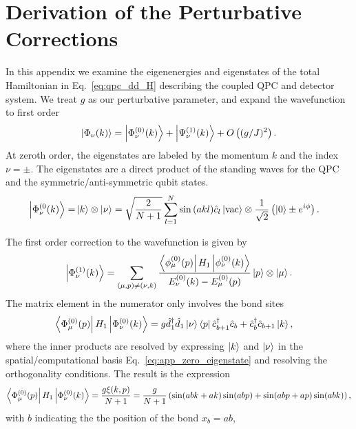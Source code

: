 \documentclass[10pt,
 amsmath,amssymb,
 aps,prb, twocolumn
]{revtex4-2}
\begin{document}
\section{Derivation of the Perturbative Corrections}\label{app:derivation_perturbative}
In this appendix we examine the eigenenergies and eigenstates of the total Hamiltonian in Eq.~\eqref{eq:qpc_dd_H} describing the coupled QPC and detector system. We treat \mbox{$g$} as our perturbative parameter, and expand the wavefunction to first order
\begin{equation}
    \ket{\Phi_{\nu} (k)} = \ket{\Phi^{(0)}_\nu (k)} + \ket{\Psi^{(1)}_\nu (k)} +O\left((g/J)^2\right).
\end{equation}
At zeroth order, the eigenstates are labeled by the momentum \mbox{$k$} and the index \mbox{$\nu = \pm$}. The eigenstates are a direct product of the standing waves for the QPC and the symmetric/anti-symmetric qubit states.
\begin{align}\label{eq:app_zero_eigenstate}
    \ket{\Phi^{(0}_\nu(k)} = & \ket{k}\otimes\ket{\nu} =  \sqrt{\frac{2}{N+1}} \sum_{l=1}^{N} \sin{(a kl)} \hat{c}_l\ket{\text{vac}}\otimes \frac{1}{\sqrt{2}}\left(\ket{0} \pm e^{i\phi}\right).
\end{align}

The first order correction to the wavefunction is given by
\begin{align}\label{eq:app_first_order1}
     \ket{\Phi_\nu^{(1)} (k)} = \sum_{(\mu,p)\neq(\nu,k)} \frac{\bra{\phi^{(0)}_\mu (p)}H_1 \ket{\phi^{(0)}_\nu (k)}}{ E_{\nu}^{(0)}(k) -  E_{\mu}^{(0)}(p)} \ket{p}\otimes \ket{\mu}.
\end{align}
The matrix element in the numerator only involves the bond sites
\begin{align*}
    \bra{\Phi^{(0)}_\mu (p)}H_1 \ket{\Phi^{(0)}_\nu (k)} & = g \hat{d}_1^{\dagger}\hat{d}_1\ket{\nu} \bra{p} \hat{c}_{b+1}^{\dagger}\hat{c}_b + \hat{c}_b^{\dagger}\hat{c}_{b+1} \ket{k},
 \end{align*}
 where the inner products are resolved by expressing $\ket{k}$ and $\ket{\nu}$ in the spatial/computational basis Eq.~\eqref{eq:app_zero_eigenstate} and resolving the orthogonality conditions. The result is the expression
 \begin{align}\label{eq:app_matrix_element}
     \bra{\Phi^{(0)}_\mu (p)}H_1 \ket{\Phi^{(0)}_\nu (k)} = \frac{g\xi(k,p)}{N+1} = \frac{g}{N+1} \left(  \sin(abk+ak )\sin(abp)  + \sin(abp+ap)\sin(abk)\right),
 \end{align}
with $b$ indicating the the position of the bond $x_b = ab$, 
\end{document}
